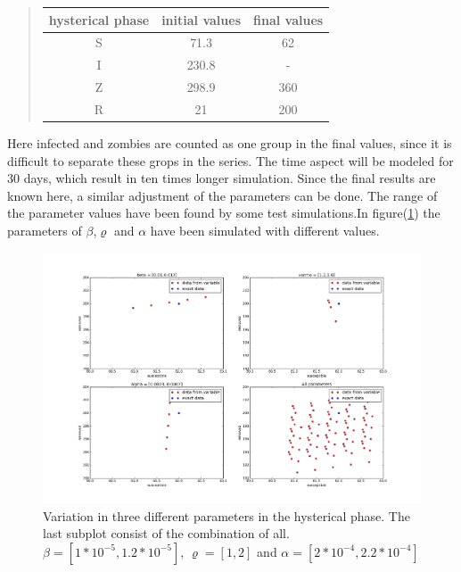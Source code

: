 \documentclass[%
twoside,                 %
final,                   %
10pt]{article}
\begin{document}
\begin{quote}
\begin{tabular}{ccc}
\hline
\multicolumn{1}{c}{ hysterical phase } & \multicolumn{1}{c}{ initial values } & \multicolumn{1}{c}{ final values } \\
\hline
S                & 71.3             & 62               \\
I                & 230.8            & -                \\
Z                & 298.9            & 360              \\
R                & 21               & 200              \\
\hline
\end{tabular}
\end{quote}

\noindent
Here infected and zombies are counted as one group in the final values, since it is difficult to separate these grops in the series. The time aspect will be modeled for 30 days, which result in ten times longer simulation. Since the final results are known here, a similar adjustment of the parameters can be done. The range of the parameter values have been found by some test simulations.In figure(\ref{fig:hysterical_variations}) the parameters of $\beta$,$\varrho$ and $\alpha$ have been simulated with different values. 


\begin{figure}[ht]
  \centerline{\includegraphics[width=0.9\linewidth]{plots/check_parameters_hysterical_2.png}}
  \caption{
  \label{fig:hysterical_variations} Variation in three different parameters in the hysterical phase. The last subplot consist of the combination of all. $\beta=[1*10^{-5},1.2*10^{-5}]$, $\varrho=[1,2]$ and $\alpha=[2*10^{-4},2.2*10^{-4}]$
  }
\end{figure}
\end{document}
